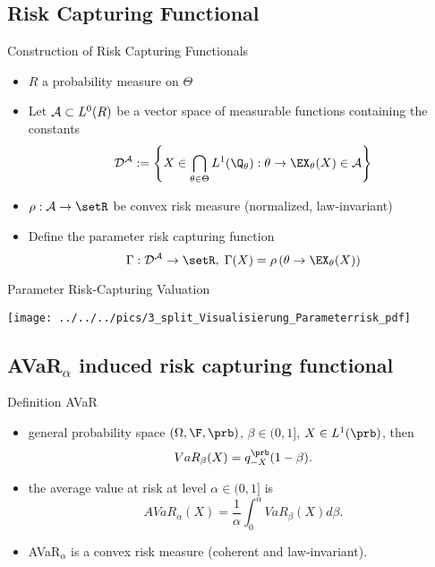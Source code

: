 \subsection{Risk Capturing Functional}

{Construction of Risk Capturing Functionals}
\begin{itemize}
\item<1-> $R$ a probability measure on $\Theta$
\item<1-> Let ${\cal A} \subset L^0(R)$ be a vector space of measurable functions containing the constants
\begin{equation}
{\cal D^A} := \left\{ X \in \bigcap_{\theta \in \Theta}  L^1(\Q_\theta): \theta \rightarrow \EX_\theta(X) \in {\cal A} \right\}
\end{equation}
\item<1-> $\rho: {\cal A} \rightarrow \setR$ be convex risk measure (normalized, law-invariant)
\item<2->

Define the parameter risk capturing function
\begin{equation}
\Gamma: {\cal D^A} \rightarrow \setR, \; \Gamma(X) = \rho\left(\theta \rightarrow \EX_\theta(X)\right)
\end{equation}
\end{itemize}

{Parameter Risk-Capturing Valuation}
\begin{center}
\texttt{[image: ../../../pics/3\_split\_Visualisierung\_Parameterrisk\_pdf]}
\end{center}

\subsection{AVaR$_\alpha$ induced risk capturing functional}

{Definition AVaR}
\begin{itemize}
\item general probability space $(\Omega, \F, \prb)$, $\beta \in (0,1]$, $X\in L^1(\prb)$, then
$$
VaR_\beta(X) = q_{-X}^{\prb}(1-\beta).
$$
\item the average value at risk at level $\alpha \in (0,1]$ is
$$
AVaR_\alpha(X) = \frac{1}{\alpha} \int_0^\alpha VaR_\beta(X) d\beta.
$$
\item AVaR$_\alpha$ is a convex risk measure (coherent and law-invariant).
\end{itemize}

